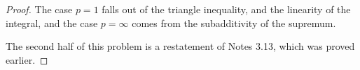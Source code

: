 \documentclass[fontsize=11pt]{scrartcl} %
\numberwithin{equation}{section} %
\numberwithin{figure}{section} %
\numberwithin{table}{section} %
\begin{document}
\begin{proof}
    The case $p=1$ falls out of the triangle inequality, and the linearity of
    the integral, and the case $p=\infty$ comes from the subadditivity of the
    supremum.

    The second half of this problem is a restatement of Notes 3.13, which was
    proved earlier.
\end{proof}
\end{document}
